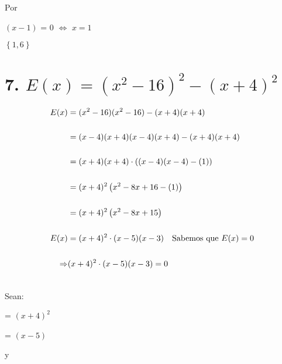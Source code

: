 \documentclass[12pt]{article}
\begin{document}
Por {}

\begin{center}
   
  $\left(x-1\right)$ = $0$  $\Leftrightarrow$ $ x= 1$ 
   
\end{center}

{}

\begin{center}
   
  $\left\{1,6\right\}$ 
   
\end{center}

\newpage

\section*{7. $E(x) = (x^{2}-16)^{2} - (x+4)^2$}

{}

\begin{equation*}
    \begin{split}
      E(x) & = (x^{2}-16)(x^{2}-16) - (x+4)(x+4)\\\\ 
      & = (x-4)(x+4)(x-4)(x+4) - (x+4)(x+4) \\\\
      & = (x+4)(x+4) \cdot\left( (x-4)(x-4) - (1) \right)\\\\ 
      & = (x+4)^{2} \left( x^{2}-8x+16 - (1) \right)\\\\
      & = (x+4)^{2} \left( x^{2}-8x+15\right)\\\\
E(x)  & = (x+4)^{2} \cdot(x-5)(x-3) \quad \textup{Sabemos que $E(x)= 0$}\\\\
      \Rightarrow & (x+4)^{2}\cdot (x-5)(x-3) = 0 \\\\
    \end{split}
\end{equation*}

Sean: 
\begin{center}
   {} = $(x+4)^{2}$   
\end{center}

\begin{center}
   {} = $(x-5)$   
\end{center}
    \begin{center}
    y
\end{center}
\end{document}
